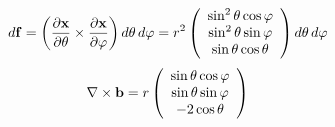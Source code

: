 {\begin{enumerate}
$$$$
$$
  d{\bf f}=
  \left(
    \frac{\partial {\bf x}}{\partial \theta} \times
    \frac{\partial {\bf x}}{\partial \varphi}
  \right)
  d\theta \, d\varphi=
  r^2
  \left(
    \begin{array}{c}
      \sin^2 \theta \cos \varphi \\
      \sin^2 \theta \sin \varphi \\
      \sin \theta \cos \theta
    \end{array}
  \right)
  d\theta \, d\varphi \label{eqn:1.14.1}
$$
$$
  \nabla \times {\bf b}=
  r
  \left(
    \begin{array}{c}
      \sin \theta \cos \varphi \\
      \sin \theta \sin \varphi \\
      -2\cos \theta
    \end{array}
  \right)
$$


\end{enumerate}}
